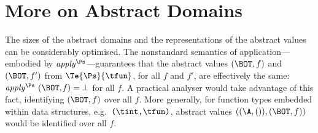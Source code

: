 

\section{More on Abstract Domains}

The sizes of the abstract domains and the representations of the
abstract values can be considerably optimised.  The nonstandard
semantics of application---embodied by $\it apply^{\Ps}$---guarantees
that the abstract values $(\BOT,f)$ and $(\BOT,f')$ from
$\Te{\Ps}{\tfun}$, for all $f$ and $f'$, are effectively the same:
$\it apply^{\Ps}~(\BOT,f)=\bot$ for all $f$.  A practical analyser
would take advantage of this fact, identifying $(\BOT,f)$ over
all $f$.  More generally, for function types embedded
within data structures, e.g.\ $\mbox{\tt (}\tint\mbox{\tt ,}\tfun\mbox{\tt )}$, abstract values
$((\A,()),(\BOT,f))$ would be identified over all $f$.

